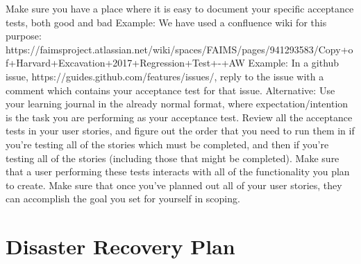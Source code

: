 \documentclass{article}
\begin{document}
Make sure you have a place where it is easy to document your specific acceptance tests, both good and bad
Example: We have used a confluence wiki for this purpose: https://faimsproject.atlassian.net/wiki/spaces/FAIMS/pages/941293583/Copy+of+Harvard+Excavation+2017+Regression+Test+-+AW
Example: In a github issue, https://guides.github.com/features/issues/, reply to the issue with a comment which contains your acceptance test for that issue.
Alternative: Use your learning journal in the already normal format, where expectation/intention is the task you are performing as your acceptance test.
Review all the acceptance tests in your user stories, and figure out the order that you need to run them in if you’re testing all of the stories which must be completed, and then if you’re testing all of the stories (including those that might be completed). Make sure that a user performing these tests interacts with all of the functionality you plan to create. 
Make sure that once you’ve planned out all of your user stories, they can accomplish the goal you set for yourself in scoping. 

\section{Disaster Recovery Plan}
\end{document}
